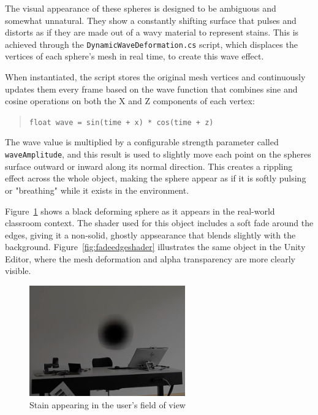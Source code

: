 \vspace{1em}

The visual appearance of these spheres is designed to be ambiguous and somewhat unnatural. They show a constantly shifting surface that pulses and distorts as if they are made out of a wavy material to represent stains. This is achieved through the \texttt{DynamicWaveDeformation.cs} script, which displaces the vertices of each sphere's mesh in real time, to create this wave effect.

\vspace{1em}

When instantiated, the script stores the original mesh vertices and continuously updates them every frame based on the wave function that combines sine and cosine operations on both the X and Z components of each vertex:

\begin{quote}
\texttt{float wave = sin(time + x) * cos(time + z)}
\end{quote}

The wave value is multiplied by a configurable strength parameter called \texttt{waveAmplitude}, and this result is used to slightly move each point on the spheres surface outward or inward along its normal direction. This creates a rippling effect across the whole object, making the sphere appear as if it is softly pulsing or "breathing" while it exists in the environment.

\vspace{1em}
Figure~\ref{fig:stain} shows a black deforming sphere as it appears in the real-world classroom context. The shader used for this object includes a soft fade around the edges, giving it a non-solid, ghostly appsearance that blends slightly with the background. Figure~\ref{fig:fadeedgeshader} illustrates the same object in the Unity Editor, where the mesh deformation and alpha transparency are more clearly visible.

\begin{figure}[h!] 
    \centering 
    \includegraphics[width=0.6\textwidth]{../../Figures/stain-video.jpg} 
    \caption{Stain appearing in the user's field of view} 
    \label{fig:stain} 
\end{figure}


